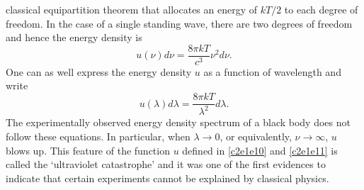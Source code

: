 classical equipartition theorem that allocates an energy of $kT/2$ to each
degree of freedom. In the case of a single standing wave, there are two degrees
of freedom and hence the energy density is
\begin{equation}\label{c2e1e10}
u(\nu)d\nu = \frac{8\pi kT}{c^3}\nu^2 d\nu.
\end{equation}
One can as well express the energy density $u$ as a function of wavelength and
write
\begin{equation}\label{c2e1e11}
u(\lambda)d\lambda = \frac{8\pi kT}{\lambda^2}d\lambda.
\end{equation}
The experimentally observed energy density spectrum of a black body does not
follow these equations. In particular, when $\lambda \rightarrow 0$, or 
equivalently, $\nu \rightarrow \infty$, $u$ blows up. This feature of the 
function $u$ defined in \eqref{c2e1e10} and \eqref{c2e1e11} is called the
`ultraviolet catastrophe' and it was one of the first evidences to indicate 
that certain experiments cannot be explained by classical physics.

